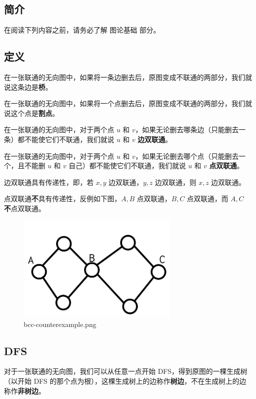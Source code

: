 
\subsection{简介}

在阅读下列内容之前，请务必了解  图论基础  部分。

\subsection{定义}

在一张联通的无向图中，如果将一条边删去后，原图变成不联通的两部分，我们就说这条边是\textbf{桥}。

在一张联通的无向图中，如果将一个点删去后，原图变成不联通的两部分，我们就说这个点是\textbf{割点}。

在一张联通的无向图中，对于两个点 $u$ 和 $v$，如果无论删去哪条边（只能删去一条）都不能使它们不联通，我们就说 $u$ 和 $v$ \textbf{边双联通}。

在一张联通的无向图中，对于两个点 $u$ 和 $v$，如果无论删去哪个点（只能删去一个，且不能删 $u$ 和 $v$ 自己）都不能使它们不联通，我们就说 $u$ 和 $v$ \textbf{点双联通}。

边双联通具有传递性，即，若 $x,y$ 边双联通，$y,z$ 边双联通，则 $x,z$ 边双联通。

点双联通\textbf{不}具有传递性，反例如下图，$A,B$ 点双联通，$B,C$ 点双联通，而 $A,C$ \textbf{不}点双联通。

\begin{figure}[htbp]
\centering
\includegraphics[width=0.7\textwidth]{docs/graph/images/bcc-counterexample.png} 
\caption{bcc-counterexample.png}
\end{figure}

\subsection{DFS}

对于一张联通的无向图，我们可以从任意一点开始 DFS，得到原图的一棵生成树（以开始 DFS 的那个点为根），这棵生成树上的边称作\textbf{树边}，不在生成树上的边称作\textbf{非树边}。

